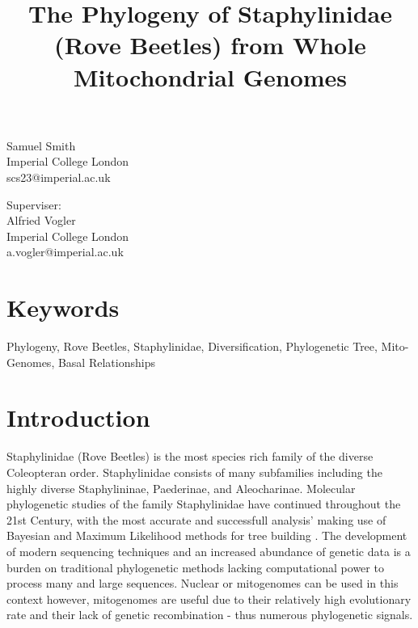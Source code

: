 \documentclass[12pt]{article}
\title{The Phylogeny of Staphylinidae (Rove Beetles) from Whole Mitochondrial Genomes}
\begin{document}
\onehalfspacing
\begin{titlepage}
    \maketitle
    \begin{center}
        Samuel Smith \\ Imperial College London \\ scs23@imperial.ac.uk
    \end{center}
    \begin{center}
        Superviser: \\ Alfried Vogler \\ Imperial College London \\ a.vogler@imperial.ac.uk
    \end{center}
\end{titlepage}


    \section{Keywords}
    Phylogeny, Rove Beetles, Staphylinidae, Diversification, Phylogenetic Tree, Mito-Genomes, Basal Relationships
    \section{Introduction}
    Staphylinidae (Rove Beetles) is the most species rich family of the diverse Coleopteran order. Staphylinidae consists of many subfamilies including the highly diverse Staphylininae, Paederinae, and Aleocharinae. Molecular phylogenetic studies of the family Staphylinidae have continued throughout the 21st Century, with the most accurate and successfull analysis' making use of Bayesian and Maximum Likelihood methods for tree building \cite{Gusarov2018}. The development of modern sequencing techniques and an increased abundance of genetic data is a burden on traditional phylogenetic methods lacking computational power to process many and large sequences. Nuclear or mitogenomes can be used in this context however, mitogenomes are useful due to their relatively high evolutionary rate and their lack of genetic recombination - thus numerous phylogenetic signals. 
\end{document}
